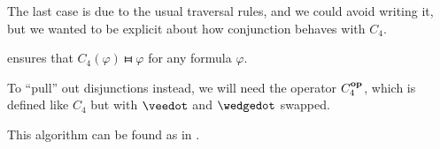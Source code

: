 \begin{algorithm}
\begin{thmenum}
    The last case is due to the usual traversal rules, and we could avoid writing it, but we wanted to be explicit about how conjunction behaves with \( C_4 \).

     ensures that \( C_4(\varphi) \gleichstark \varphi \) for any formula \( \varphi \).

    To \enquote{pull} out disjunctions instead, we will need the operator \( C_4^\oppos \), which is defined like \( C_4 \) but with \( \synvee \) and \( \synwedge \) swapped.
  \end{thmenum}
\end{algorithm}
\begin{comments}
  \item This algorithm can be found as  in \cite{code}.
\end{comments}

